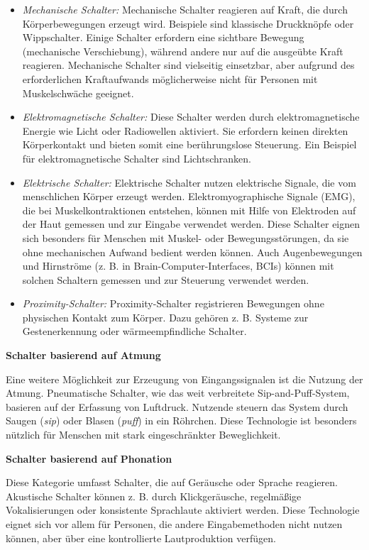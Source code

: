 \begin{itemize}
    \item \textit{Mechanische Schalter:}
    Mechanische Schalter reagieren auf Kraft, die durch Körperbewegungen erzeugt wird. Beispiele sind klassische Druckknöpfe oder Wippschalter. Einige Schalter erfordern eine sichtbare Bewegung (mechanische Verschiebung), während andere nur auf die ausgeübte Kraft reagieren. Mechanische Schalter sind vielseitig einsetzbar, aber aufgrund des erforderlichen Kraftaufwands möglicherweise nicht für Personen mit Muskelschwäche geeignet.
    \item \textit{Elektromagnetische Schalter:}
    Diese Schalter werden durch elektromagnetische Energie wie Licht oder Radiowellen aktiviert. Sie erfordern keinen direkten Körperkontakt und bieten somit eine berührungslose Steuerung. Ein Beispiel für elektromagnetische Schalter sind Lichtschranken.
    \item \textit{Elektrische Schalter:}
    Elektrische Schalter nutzen elektrische Signale, die vom menschlichen Körper erzeugt werden. Elektromyographische Signale (EMG), die bei Muskelkontraktionen entstehen, können mit Hilfe von Elektroden auf der Haut gemessen und zur Eingabe verwendet werden. Diese Schalter eignen sich besonders für Menschen mit Muskel- oder Bewegungsstörungen, da sie ohne mechanischen Aufwand bedient werden können. Auch Augenbewegungen und Hirnströme (z. B.  in Brain-Computer-Interfaces, BCIs) können mit solchen Schaltern gemessen und zur Steuerung verwendet werden.
    \item \textit{Proximity-Schalter:}
    Proximity-Schalter registrieren Bewegungen ohne physischen Kontakt zum Körper. Dazu gehören z. B.  Systeme zur Gestenerkennung oder wärmeempfindliche Schalter.   
\end{itemize}

\textbf{Schalter basierend auf Atmung}

Eine weitere Möglichkeit zur Erzeugung von Eingangssignalen ist die Nutzung der Atmung. Pneumatische Schalter, wie das weit verbreitete Sip-and-Puff-System, basieren auf der Erfassung von Luftdruck. Nutzende steuern das System durch Saugen (\textit{sip}) oder Blasen (\textit{puff}) in ein Röhrchen. Diese Technologie ist besonders nützlich für Menschen mit stark eingeschränkter Beweglichkeit.

\textbf{Schalter basierend auf Phonation}

Diese Kategorie umfasst Schalter, die auf Geräusche oder Sprache reagieren. Akustische Schalter können z. B. durch Klickgeräusche, regelmäßige Vokalisierungen oder konsistente Sprachlaute aktiviert werden. 
Diese Technologie eignet sich vor allem für Personen, die andere Eingabemethoden nicht nutzen können, aber über eine kontrollierte Lautproduktion verfügen.

